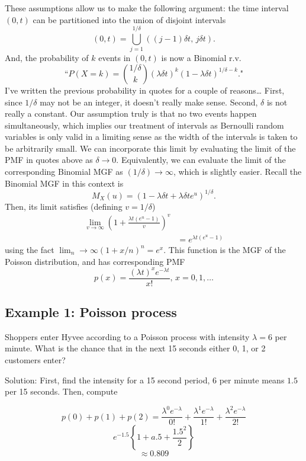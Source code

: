 \documentclass[
]{book}
\begin{document}
These assumptions allow us to make the following argument: the time interval \((0,t)\) can be partitioned into the union of disjoint intervals
\[(0,t) = \bigcup_{j=1}^{1/\delta} ((j-1)\delta t, \, j\delta t).\]
And, the probability of \(k\) events in \((0,t)\) is now a Binomial r.v.
\[\text{``}P(X = k) = {1/\delta\choose k} (\lambda \delta t)^k (1- \lambda \delta t)^{1/\delta - k}.\text{"}\]
I've written the previous probability in quotes for a couple of reasons\ldots{} First, since \(1/\delta\) may not be an integer, it doesn't really make sense. Second, \(\delta\) is not really a constant. Our assumption truly is that no two events happen simultaneously, which implies our treatment of intervals as Bernoulli random variables is only valid in a limiting sense as the width of the intervals is taken to be arbitrarily small. We can incorporate this limit by evaluating the limit of the PMF in quotes above as \(\delta \rightarrow 0\). Equivalently, we can evaluate the limit of the corresponding Binomial MGF as \((1/\delta)\rightarrow \infty\), which is slightly easier. Recall the Binomial MGF in this context is
\[M_X(u) = (1- \lambda \delta t + \lambda \delta t e^u)^{1/\delta}.\]
Then, its limit satisfies (defining \(v = 1/\delta\))
\begin{align*}
\lim_{v \rightarrow \infty} \left(1+ \frac{\lambda t(e^u -1)}{v}\right)^{v}\\
& = e^{\lambda t(e^u - 1)}
\end{align*}
using the fact \(\lim_n\rightarrow \infty (1+x/n)^n = e^x.\)
This function is the MGF of the Poisson distribution, and has corresponding PMF
\[p(x) = \frac{(\lambda t)^x e^{-\lambda t}}{x!},\, x=0,1,\ldots\]

\hypertarget{example-1-poisson-process}{%
\subsection{Example 1: Poisson process}\label{example-1-poisson-process}}

Shoppers enter Hyvee according to a Poisson process with intensity \(\lambda = 6\) per minute. What is the chance that in the next 15 seconds either 0, 1, or 2 customers enter?

Solution: First, find the intensity for a 15 second period, \(6\) per minute means \(1.5\) per 15 seconds. Then, compute

\[p(0)+p(1)+p(2) = \frac{\lambda^0e^{-\lambda}}{0!}+\frac{\lambda^1e^{-\lambda}}{1!}+\frac{\lambda^2e^{-\lambda}}{2!}\]
\[e^{-1.5}\left\{1+a.5 + \frac{1.5^2}{2}\right\}\]
\[ \approx 0.809\]
\end{document}

